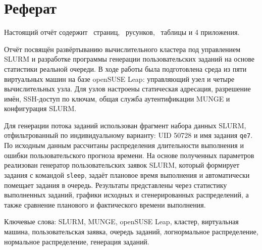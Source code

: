 \section*{Реферат}

Настоящий отчёт содержит \ztotpages\ страниц, \totalfigures\ русунков, \totaltables\ таблицы и 4 приложения.

Отчёт посвящён развёртыванию вычислительного кластера под управлением SLURM и разработке программы генерации пользовательских заданий на основе статистики реальной очереди. В ходе работы была подготовлена среда из пяти виртуальных машин на базе openSUSE Leap: управляющий узел и четыре вычислительных узла. Для узлов настроены статическая адресация, разрешение имён, SSH-доступ по ключам, общая служба аутентификации MUNGE и конфигурация SLURM.

Для генерации потока заданий использован фрагмент набора данных SLURM, отфильтрованный по индивидуальному варианту: UID 50728 и имя задания \texttt{qe7}. По исходным данным рассчитаны распределения длительности выполнения и ошибки пользовательского прогноза времени. На основе полученных параметров реализован генератор пользовательских заявок SLURM, который формирует задания с командой \texttt{sleep}, задаёт плановое время выполнения и автоматически помещает задания в очередь. Результаты представлены через статистику выполненных заданий, графики исходных и сгенерированных распределений, а также сравнение планового и фактического времени выполнения.

Ключевые слова: SLURM, MUNGE, openSUSE Leap, кластер, виртуальная машина, пользовательская заявка, очередь заданий, логнормальное распределение, нормальное распределение, генерация заданий.

\newpage
